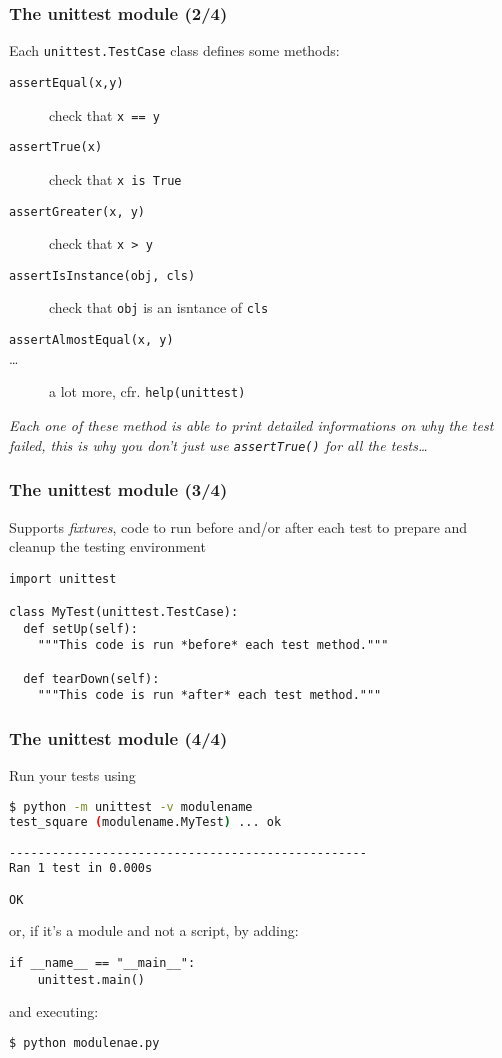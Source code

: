 \documentclass[english,serif,mathserif,xcolor=pdftex,dvipsnames,table]{beamer}
\begin{document}
\begin{frame}[fragile]
  \frametitle{The unittest module (2/4)}

  Each \lstinline|unittest.TestCase| class defines some methods:
  \begin{description}
  \item [\texttt{assertEqual(x,y)}] check that \lstinline|x == y|
  \item[\texttt{assertTrue(x)}] check that \lstinline|x is True|
  \item[\texttt{assertGreater(x, y)}] check that \lstinline|x > y|
  \item[\texttt{assertIsInstance(obj, cls)}] check that
    \lstinline|obj| is an isntance of \lstinline|cls|
  \item[\texttt{assertAlmostEqual(x, y)}]
  \item[\ldots] a lot more, cfr. \lstinline|help(unittest)|
  \end{description}

  \+
\textit{Each one of these method is able to print detailed informations on
  why the test failed, this is why you don't just use
  \texttt{assertTrue()} for all the tests\ldots}
\end{frame}


\begin{frame}[fragile]
  \frametitle{The unittest module (3/4)}
  Supports \textit{fixtures}, code to run before and/or after each
  test to prepare and cleanup the testing environment

  \+
  \begin{lstlisting}
import unittest

class MyTest(unittest.TestCase):
  def setUp(self):
    """This code is run *before* each test method."""

  def tearDown(self):
    """This code is run *after* each test method."""
  \end{lstlisting}
\end{frame}


\begin{frame}[fragile]
\frametitle{The unittest module (4/4)}
Run your tests using
\+
  \begin{lstlisting}[language=sh]
$ python -m unittest -v modulename
test_square (modulename.MyTest) ... ok

--------------------------------------------------
Ran 1 test in 0.000s

OK
\end{lstlisting}

or, if it's a module and not a script, by adding:
\begin{lstlisting}
if __name__ == "__main__":
    unittest.main()
\end{lstlisting}
and executing:

\begin{lstlisting}[language=sh]
$ python modulenae.py
\end{lstlisting}%

\end{frame}
\end{document}
